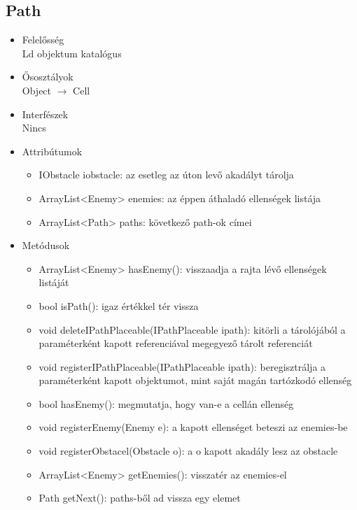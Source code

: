 \subsection{Path}
\begin{itemize}
\item Felelősség\\
Ld objektum katalógus
\item Ősosztályok\\
Object $\rightarrow$ Cell
\item Interfészek\\
Nincs
\item Attribútumok
	\begin{itemize}
		\item IObstacle iobstacle: az esetleg az úton levő akadályt tárolja
		\item ArrayList<Enemy> enemies: az éppen áthaladó ellenségek listája
		\item ArrayList<Path> paths: következő path-ok címei

		
	\end{itemize}
\item Metódusok
	\begin{itemize}
		\item ArrayList<Enemy> hasEnemy(): visszaadja a rajta lévő ellenségek listáját
		\item bool isPath(): igaz értékkel tér vissza
		\item void deleteIPathPlaceable(IPathPlaceable ipath): kitörli a tárolójából a paraméterként kapott referenciával megegyező tárolt referenciát
		\item void registerIPathPlaceable(IPathPlaceable ipath): beregisztrálja a paraméterként kapott objektumot, mint saját magán tartózkodó ellenség
		\item bool hasEnemy(): megmutatja, hogy van-e a cellán ellenség
		\item void registerEnemy(Enemy e): a kapott ellenséget beteszi az enemies-be
		\item void registerObstacel(Obstacle o): a o kapott akadály lesz az obstacle
		\item ArrayList<Enemy> getEnemies(): visszatér az enemies-el
		\item Path getNext(): paths-ből ad vissza egy elemet
		
		
	\end{itemize}
\end{itemize}

%

